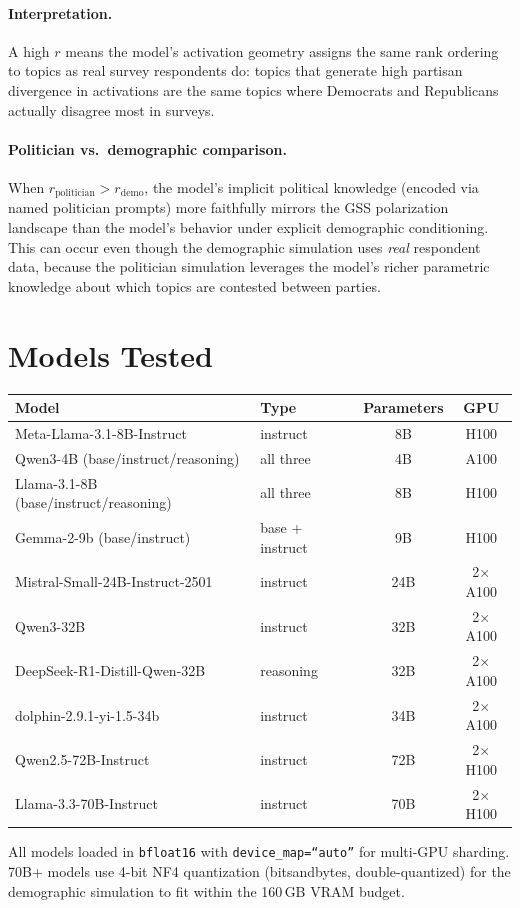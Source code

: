 \documentclass[12pt]{article}
\begin{document}
\paragraph{Interpretation.}
A high $r$ means the model's activation geometry assigns the same rank ordering to topics as real survey respondents do: topics that generate high partisan divergence in activations are the same topics where Democrats and Republicans actually disagree most in surveys.

\paragraph{Politician vs.\ demographic comparison.}
When $r_\text{politician} > r_\text{demo}$, the model's implicit political knowledge (encoded via named politician prompts) more faithfully mirrors the GSS polarization landscape than the model's behavior under explicit demographic conditioning. This can occur even though the demographic simulation uses \textit{real} respondent data, because the politician simulation leverages the model's richer parametric knowledge about which topics are contested between parties.

\section{Models Tested}
\label{sec:models}

\begin{center}
\begin{tabular}{llcc}
\toprule
Model & Type & Parameters & GPU \\
\midrule
Meta-Llama-3.1-8B-Instruct & instruct & 8B & H100 \\
Qwen3-4B (base/instruct/reasoning) & all three & 4B & A100 \\
Llama-3.1-8B (base/instruct/reasoning) & all three & 8B & H100 \\
Gemma-2-9b (base/instruct) & base + instruct & 9B & H100 \\
Mistral-Small-24B-Instruct-2501 & instruct & 24B & 2$\times$A100 \\
Qwen3-32B & instruct & 32B & 2$\times$A100 \\
DeepSeek-R1-Distill-Qwen-32B & reasoning & 32B & 2$\times$A100 \\
dolphin-2.9.1-yi-1.5-34b & instruct & 34B & 2$\times$A100 \\
Qwen2.5-72B-Instruct & instruct & 72B & 2$\times$H100 \\
Llama-3.3-70B-Instruct & instruct & 70B & 2$\times$H100 \\
\bottomrule
\end{tabular}
\end{center}

\noindent All models loaded in \texttt{bfloat16} with \texttt{device\_map=``auto''} for multi-GPU sharding. 70B+ models use 4-bit NF4 quantization (bitsandbytes, double-quantized) for the demographic simulation to fit within the 160\,GB VRAM budget.
\end{document}
